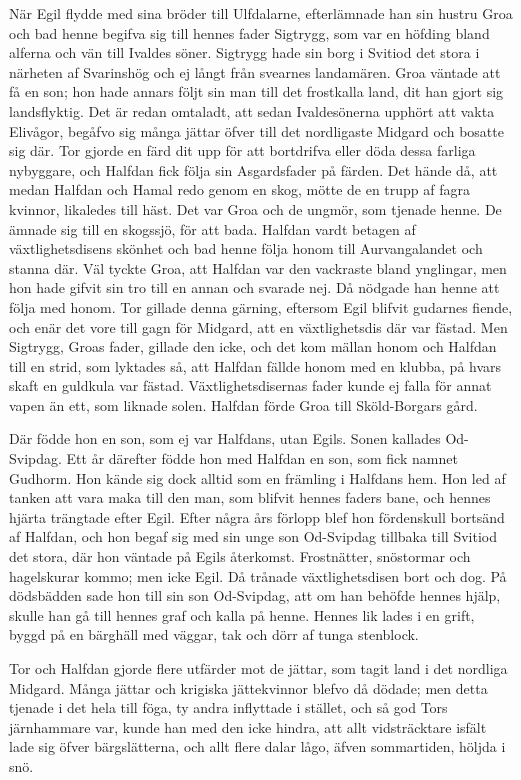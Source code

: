 När Egil flydde med sina bröder till Ulfdalarne, efterlämnade han sin
hustru Groa och bad henne begifva sig till hennes fader Sigtrygg, som
var en höfding bland alferna och vän till Ivaldes söner. Sigtrygg hade
sin borg i Svitiod det stora i närheten af Svarinshög och ej långt från
svearnes landamären. Groa väntade att få en son; hon hade annars följt
sin man till det frostkalla land, dit han gjort sig landsflyktig. Det är
redan omtaladt, att sedan Ivaldesönerna upphört att vakta Elivågor,
begåfvo sig många jättar öfver till det nordligaste Midgard och bosatte
sig där. Tor gjorde en färd dit upp för att bortdrifva eller döda dessa
farliga nybyggare, och Halfdan fick följa sin Asgardsfader på färden.
Det hände då, att medan Halfdan och Hamal redo genom en skog, mötte de
en trupp af fagra kvinnor, likaledes till häst. Det var Groa och de
ungmör, som tjenade henne. De ämnade sig till en skogssjö, för att bada.
Halfdan vardt betagen af växtlighetsdisens skönhet och bad henne följa
honom till Aurvangalandet och stanna där. Väl tyckte Groa, att Halfdan
var den vackraste bland ynglingar, men hon hade gifvit sin tro till en
annan och svarade nej. Då nödgade han henne att följa med honom. Tor
gillade denna gärning, eftersom Egil blifvit gudarnes fiende, och enär
det vore till gagn för Midgard, att en växtlighetsdis där var fästad.
Men Sigtrygg, Groas fader, gillade den icke, och det kom mällan honom
och Halfdan till en strid, som lyktades så, att Halfdan fällde honom med
en klubba, på hvars skaft en guldkula var fästad. Växtlighetsdisernas
fader kunde ej falla för annat vapen än ett, som liknade solen. Halfdan
förde Groa till Sköld-Borgars gård.

Där födde hon en son, som ej var Halfdans, utan Egils. Sonen kallades
Od-Svipdag. Ett år därefter födde hon med Halfdan en son, som fick
namnet Gudhorm. Hon kände sig dock alltid som en främling i Halfdans
hem. Hon led af tanken att vara maka till den man, som blifvit hennes
faders bane, och hennes hjärta trängtade efter Egil. Efter några års
förlopp blef hon fördenskull bortsänd af Halfdan, och hon begaf sig med
sin unge son Od-Svipdag tillbaka till Svitiod det stora, där hon väntade
på Egils återkomst. Frostnätter, snöstormar och hagelskurar kommo; men
icke Egil. Då trånade växtlighetsdisen bort och dog. På dödsbädden sade
hon till sin son Od-Svipdag, att om han behöfde hennes hjälp, skulle han
gå till hennes graf och kalla på henne. Hennes lik lades i en grift,
byggd på en bärghäll med väggar, tak och dörr af tunga stenblock.

Tor och Halfdan gjorde flere utfärder mot de jättar, som tagit land i
det nordliga Midgard. Många jättar och krigiska jättekvinnor blefvo då
dödade; men detta tjenade i det hela till föga, ty andra inflyttade i
stället, och så god Tors järnhammare var, kunde han med den icke hindra,
att allt vidsträcktare isfält lade sig öfver bärgslätterna, och allt
flere dalar lågo, äfven sommartiden, höljda i snö.


